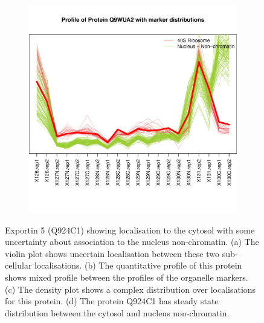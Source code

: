 \documentclass[12pt,english]{article}\usepackage[]{graphicx}\usepackage[]{color}
\makeatletter
\def\maxwidth{ %
  \ifdim\Gin@nat@width>\linewidth
    \linewidth
  \else
    \Gin@nat@width
  \fi
}
\newenvironment{knitrout}{}{} %
\makeatother
\begin{document}
\begin{figure}[h]
\begin{subfigure}[t]{0.5\textwidth}
\begin{knitrout}
{}



\end{knitrout}
    \caption{}
  \end{subfigure}%
  \begin{subfigure}[t]{0.5\textwidth}
    \centering
\begin{knitrout}
\color{fgcolor}

{\centering \includegraphics[width=\maxwidth]{figure/unnamed-chunk-17-1} 

}



\end{knitrout}
    \caption{}
  \end{subfigure}

  \caption{Exportin 5 (Q924C1) showing localisation to the
  cytosol with some uncertainty about association to the nucleus non-chromatin.
  (a) The violin plot shows
    uncertain localisation between these two sub-cellular
    localisations. (b) The
    quantitative profile of this protein shows mixed profile between the
    profiles of the organelle markers. (c) The density plot shows a
    complex distribution over localisations for this protein. (d) The protein Q924C1 has steady state
    distribution between the cytosol and nucleus non-chromatin.}
  \label{fig:Q924C1}
\end{figure}
\end{document}
